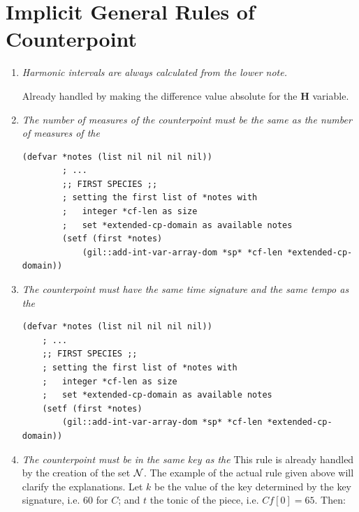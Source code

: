 \section*{Implicit General Rules of Counterpoint}


\begin{enumerate}[wide, label=\bfseries G\arabic*]
    \item \textit{Harmonic intervals are always calculated from the lower note.} \label{rule:hfromlower}

    Already handled by making the difference value absolute for the \textbf{H} variable. 

    \item \textit{The number of measures of the counterpoint must be the same as the number of measures of the \cfdot} \label{rule:sameNbMeasures}

    \begin{lstlisting}[caption=Definition of $N$ in the first species., label=lst:defcp, basicstyle=\ttfamily\small]
        (defvar *notes (list nil nil nil nil))
        ; ...
        ;; FIRST SPECIES ;;
        ; setting the first list of *notes with
        ;   integer *cf-len as size
        ;   set *extended-cp-domain as available notes
        (setf (first *notes)
            (gil::add-int-var-array-dom *sp* *cf-len *extended-cp-domain))
        \end{lstlisting}

    \item \textit{The counterpoint must have the same time signature and the same tempo as the \cfdot} \label{rule:sameTimeSignature}

    \begin{lstlisting}[caption=Definition of $N$ in the first species., label=lst:defcp, basicstyle=\ttfamily\small]
    (defvar *notes (list nil nil nil nil))
    ; ...
    ;; FIRST SPECIES ;;
    ; setting the first list of *notes with
    ;   integer *cf-len as size
    ;   set *extended-cp-domain as available notes
    (setf (first *notes)
        (gil::add-int-var-array-dom *sp* *cf-len *extended-cp-domain))
    \end{lstlisting}
    
    \item \textit{The counterpoint must be in the same key as the \cfdot}\label{rule:samekey}
    This rule is already handled by the creation of the set $\mathcal{N}$. The example of the actual rule given above will clarify the explanations. Let $k$ be the value of the key determined by the key signature, i.e. $60$ for $C$; and $t$ the tonic of the piece, i.e. $Cf[0]=65$. Then:


\end{enumerate}
